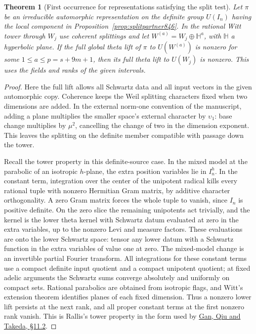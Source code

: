 \documentclass[a4paper,11pt]{article}
\newtheorem{theorem}[proposition]{Theorem}
\theoremstyle{definition}
\theoremstyle{remark}
\numberwithin{equation}{section}
\begin{document}
\begin{theorem}[First occurrence for representations satisfying the split test]
\leavevmode\label{thm:descenttower846}
Let \(\pi\) be an irreducible automorphic representation on the
definite group \(U(I_n)\) having the local component in
Proposition~\ref{prop:splitpartner846}. In the rational Witt tower
through \(W_j\) use coherent splittings and let
\(W^{(a)}=W_j\oplus\mathbb H^a\), with \(\mathbb H\) a hyperbolic
plane. If the full global theta lift of \(\pi\) to \(U(W^{(a)})\)
is nonzero for some \(1\le a\le p=s+9m+1\), then its full theta
lift to \(U(W_j)\) is nonzero. This uses the fields and ranks of
the given intervals.
\end{theorem}
\begin{proof}
Here the full lift allows all Schwartz data and all input vectors
in the given automorphic copy. Coherence keeps the Weil splitting
characters fixed when two dimensions are added. In the external
norm-one convention of the manuscript, adding a plane multiplies
the smaller space's external character by \(\upsilon_1\):
base change multiplies by \(\mu^2\), cancelling the change of two
in the dimension exponent. This leaves the splitting on the
definite member compatible with passage down the tower.

Recall the tower property in this definite-source case. In the
mixed model at the parabolic of an isotropic \(h\)-plane, the
extra position variables lie in \(I_n^h\). In the constant term,
integration over the center of the unipotent radical kills every
rational tuple with nonzero Hermitian Gram matrix, by additive
character orthogonality. A zero Gram matrix forces the whole
tuple to vanish, since \(I_n\) is positive definite. On the zero
slice the remaining unipotents act trivially, and the kernel
is the lower theta kernel with Schwartz datum evaluated at zero
in the extra variables, up to the nonzero Levi and measure
factors. These evaluations are onto the lower Schwartz space:
tensor any lower datum with a Schwartz function in the extra
variables of value one at zero. The mixed-model change is an
invertible partial Fourier transform. All integrations for these
constant terms use a compact definite input quotient and a compact
unipotent quotient; at fixed adelic arguments the Schwartz sums
converge absolutely and uniformly on compact sets. Rational
parabolics are obtained from isotropic flags, and Witt's extension
theorem identifies planes of each fixed dimension. Thus a nonzero
lower lift persists at the next rank, and all proper constant
terms at the first nonzero rank vanish. This is Rallis's tower
property in the form used by
\href{https://arxiv.org/pdf/1207.4709}
{Gan, Qiu and Takeda, \S11.2}.


\end{proof}
\end{document}
